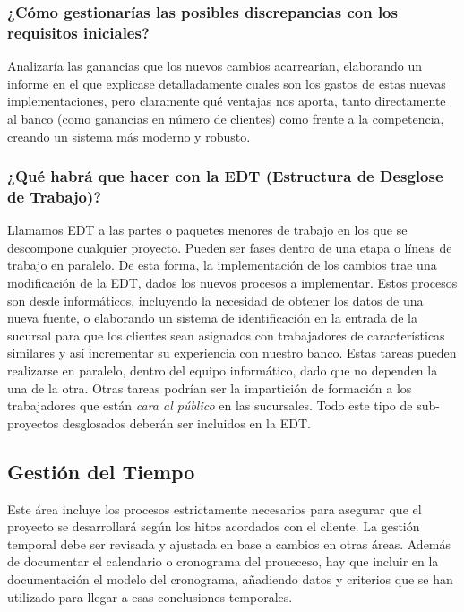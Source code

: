 \documentclass{article}
\begin{document}
\subsubsection{¿Cómo gestionarías las posibles discrepancias con los requisitos iniciales?}

Analizaría las ganancias que los nuevos cambios acarrearían, elaborando un informe en el que explicase detalladamente cuales son los gastos de estas nuevas implementaciones, pero claramente qué ventajas nos aporta, tanto directamente al banco (como ganancias en número de clientes) como frente a la competencia, creando un sistema más moderno y robusto.

\subsubsection{¿Qué habrá que hacer con la EDT (Estructura de Desglose de Trabajo)?}

Llamamos EDT a las partes o paquetes menores de trabajo en los que se descompone cualquier proyecto. Pueden ser fases dentro de una etapa o líneas de trabajo en paralelo. De esta forma, la implementación de los cambios trae una modificación de la EDT, dados los nuevos procesos a implementar. Estos procesos son desde informáticos, incluyendo la necesidad de obtener los datos de una nueva fuente, o elaborando un sistema de identificación en la entrada de la sucursal para que los clientes sean asignados con trabajadores de características similares y así incrementar su experiencia con nuestro banco. Estas tareas pueden realizarse en paralelo, dentro del equipo informático, dado que no dependen la una de la otra. Otras tareas podrían ser la impartición de formación a los trabajadores que están \textit{cara al público} en las sucursales. Todo este tipo de sub-proyectos desglosados deberán ser incluidos en la EDT.

\subsection{Gestión del Tiempo}
Este área incluye los procesos estrictamente necesarios para asegurar que el proyecto se desarrollará según los hitos acordados con el cliente. La gestión temporal debe ser revisada y ajustada en base a cambios en otras áreas. Además de documentar el calendario o cronograma del proueceso, hay que incluir en la documentación el modelo del cronograma, añadiendo datos y criterios que se han utilizado para llegar a esas conclusiones temporales.
\end{document}
